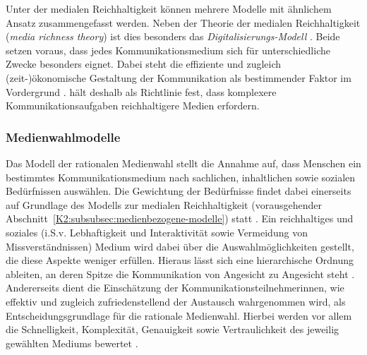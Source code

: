 \label{K2:para:media-richness}
\begin{sloppypar}
Unter der medialen Reichhaltigkeit  können mehrere Modelle mit ähnlichem Ansatz zusammengefasst werden. Neben der Theorie der medialen Reichhaltigkeit (\emph{media richness theory}) \citep[161]{trepte_medienpsychologie_2012} ist dies besonders das \emph{Digitalisierungs-Modell} \citep[427]{doring_c_2013}. Beide setzen voraus, dass jedes Kommunikationsmedium sich für unterschiedliche Zwecke besonders eignet. Dabei steht die effiziente und zugleich (zeit-)ökonomische Gestaltung der Kommunikation als bestimmender Faktor im Vordergrund \citep[161]{trepte_medienpsychologie_2012}. \citet[171]{schweiger_sozialkontakte_2019} hält deshalb als Richtlinie fest, dass \glqq komplexere Kommunikationsaufgaben reichhaltigere Medien erfordern\grqq{}.
\end{sloppypar}



\subsubsection{Medienwahlmodelle}
\label{K2:subsubsec:medienwahlmodelle}


\label{K2:para:rationale-medienwahl}
\begin{sloppypar}
Das Modell der rationalen Medienwahl stellt die Annahme auf, dass Menschen ein bestimmtes Kommunikationsmedium nach sachlichen, inhaltlichen sowie sozialen Bedürfnissen auswählen. Die Gewichtung der Bedürfnisse findet dabei einerseits auf Grundlage des Modells zur medialen Reichhaltigkeit (vorausgehender Abschnitt~\ref{K2:subsubsec:medienbezogene-modelle}) statt \citep[96]{misoch_online-kommunikation_2006}. Ein reichhaltiges und soziales (i.S.v. Lebhaftigkeit und Interaktivität sowie Vermeidung von Missverständnissen) Medium wird dabei über die Auswahlmöglichkeiten gestellt, die diese Aspekte weniger erfüllen. Hieraus lässt sich eine hierarchische Ordnung ableiten, an deren Spitze die Kommunikation von Angesicht zu Angesicht steht \citep[425]{doring_c_2013}.
Andererseits dient die Einschätzung der Kommunikationsteilnehmer{\textperiodcentered}innen, wie effektiv und zugleich zufriedenstellend der Austausch wahrgenommen wird, als Entscheidungsgrundlage für die rationale Medienwahl. Hierbei werden vor allem die Schnelligkeit, Komplexität, Genauigkeit sowie Vertraulichkeit des jeweilig gewählten Mediums bewertet \citep[96]{misoch_online-kommunikation_2006}.
\end{sloppypar}

